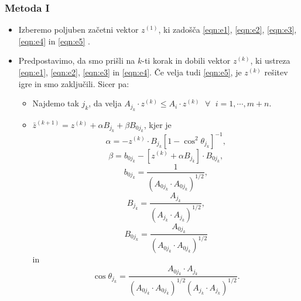 \documentclass{beamer}
\theoremstyle{definition}
\theoremstyle{plain}
\begin{document}
\begin{frame}
    \frametitle{Metoda I}
    \begin{itemize}
        \item Izberemo poljuben začetni vektor $z^{(1)}$, ki zadošča \ref{eqn:e1}, \ref{eqn:e2}, \ref{eqn:e3}, \ref{eqn:e4} in \ref{eqn:e5} . 
        \item Predpostavimo, da smo prišli na $k$-ti korak in dobili vektor $z^{(k)}$,  ki ustreza \ref{eqn:e1}, \ref{eqn:e2}, \ref{eqn:e3} in \ref{eqn:e4}. Če velja tudi
    \ref{eqn:e5}, je $z^{(k)}$ rešitev igre in smo zaključili. Sicer pa:
    \begin{itemize}
     \item Najdemo tak $j_k$, da velja $A_{j_k} \cdot z^{(k)} \leq A_i \cdot z^{(k)}$ $\; \forall \; $ $i = 1, \cdots, m + n$. 
     \item $\bar{z}^{(k+1)} = z^{(k)} + \alpha B_{j_k} + \beta B_{0j_k}$,
    kjer je
    \begin{equation*}
        \alpha = - z^{(k)} \cdot B_{j_k} [1 - \cos^2{\theta_{j_k}}]^{-1},
    \end{equation*}
    \begin{equation*}
        \beta = b_{0j_k} - [z^{(k)} + \alpha B_{j_k}] \cdot B_{0j_k},
    \end{equation*}
    \begin{equation*}
        b_{0j_k} = \frac{1}{(A_{0j_k}\cdot A_{0j_k})^{1/2}},
    \end{equation*}
    \begin{equation*}
    B_{j_k} = \frac{A_{j_k}}{(A_{j_k} \cdot A_{j_k})^{1/2}}, 
    \end{equation*}
    \begin{equation*}
    B_{0j_k} = \frac{A_{0j_k}}{(A_{0j_k}\cdot A_{0j_k})^{1/2}}
    \end{equation*}
    in 
    \begin{equation*}
     \cos{\theta_{j_k}} = \frac{A_{0j_k} \cdot A_{j_k}}{(A_{0j_k}\cdot A_{0j_k})^{1/2}(A_{j_k}\cdot A_{j_k})^{1/2}}.
    \end{equation*}
\end{itemize}
\end{itemize}
\end{frame}
\end{document}
